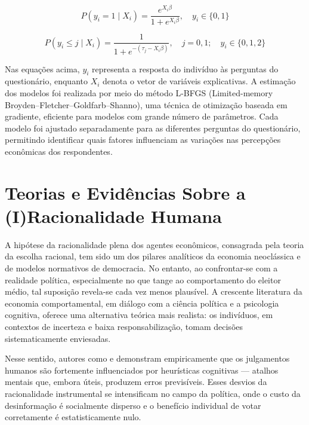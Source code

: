 \begin{equation}
    P(y_i = 1 \mid X_i) = \frac{e^{X_i \beta}}{1 + e^{X_i \beta}}, \quad y_i \in \{0, 1\}
\end{equation}

\begin{equation}
    P(y_i \leq j \mid X_i) = \frac{1}{1 + e^{-(\tau_j - X_i \beta)}}, \quad j = 0, 1; \quad y_i \in \{0, 1, 2\}
\end{equation}




Nas equações acima, \( y_i \) representa a resposta do indivíduo às perguntas do questionário, enquanto \( X_i \) denota o vetor de variáveis explicativas. A estimação dos modelos foi realizada por meio do método L-BFGS (Limited-memory Broyden–Fletcher–Goldfarb–Shanno), uma técnica de otimização baseada em gradiente, eficiente para modelos com grande número de parâmetros. Cada modelo foi ajustado separadamente para as diferentes perguntas do questionário, permitindo identificar quais fatores influenciam as variações nas percepções econômicas dos respondentes.


\chapter{Teorias e Evidências Sobre a (I)Racionalidade Humana} %


A hipótese da racionalidade plena dos agentes econômicos, consagrada pela teoria da escolha racional, tem sido um dos pilares analíticos da economia neoclássica e de modelos normativos de democracia. No entanto, ao confrontar-se com a realidade política, especialmente no que tange ao comportamento do eleitor médio, tal suposição revela-se cada vez menos plausível. A crescente literatura da economia comportamental, em diálogo com a ciência política e a psicologia cognitiva, oferece uma alternativa teórica mais realista: os indivíduos, em contextos de incerteza e baixa responsabilização, tomam decisões sistematicamente enviesadas.

Nesse sentido, autores como  e  demonstram empiricamente que os julgamentos humanos são fortemente influenciados por heurísticas cognitivas — atalhos mentais que, embora úteis, produzem erros previsíveis. Esses desvios da racionalidade instrumental se intensificam no campo da política, onde o custo da desinformação é socialmente disperso e o benefício individual de votar corretamente é estatisticamente nulo.


